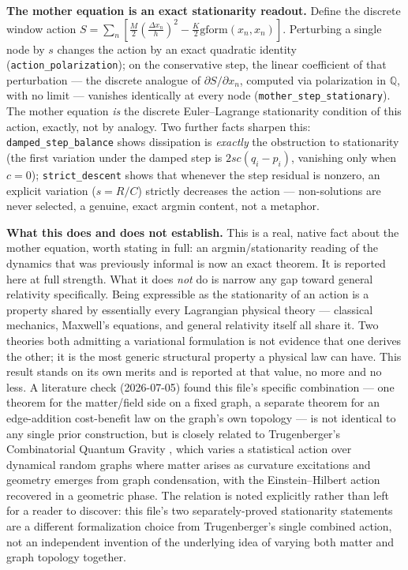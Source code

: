 \documentclass[10pt,twocolumn]{article}
\begin{document}
\textbf{The mother equation is an exact stationarity readout.} Define the discrete
window action $S=\sum_n\left[\frac{M}{2}\left(\frac{\Delta x_n}{h}\right)^2 -
\frac{K}{2}\mathrm{gform}(x_n,x_n)\right]$. Perturbing a single node by $s$ changes
the action by an exact quadratic identity (\texttt{action\_polarization}); on the
conservative step, the linear coefficient of that perturbation --- the discrete
analogue of $\partial S/\partial x_n$, computed via polarization in $\mathbb{Q}$,
with no limit --- vanishes identically at every node
(\texttt{mother\_step\_stationary}). The mother equation \emph{is} the discrete
Euler--Lagrange stationarity condition of this action, exactly, not by analogy.
Two further facts sharpen this: \texttt{damped\_step\_balance} shows dissipation is
\emph{exactly} the obstruction to stationarity (the first variation under the
damped step is $2sc(q_i-p_i)$, vanishing only when $c=0$); \texttt{strict\_descent}
shows that whenever the step residual is nonzero, an explicit variation
($s=R/C$) strictly decreases the action --- non-solutions are never selected, a
genuine, exact argmin content, not a metaphor.

\textbf{What this does and does not establish.} This is a real, native fact about
the mother equation, worth stating in full: an argmin/stationarity reading of the
dynamics that was previously informal is now an exact theorem. It is reported here
at full strength. What it does \emph{not} do is narrow any gap toward general
relativity specifically. Being expressible as the stationarity of an action is a
property shared by essentially every Lagrangian physical theory --- classical
mechanics, Maxwell's equations, and general relativity itself all share it. Two
theories both admitting a variational formulation is not evidence that one derives
the other; it is the most generic structural property a physical law can have.
This result stands on its own merits and is reported at that value, no more and no
less. A literature check (2026-07-05) found this file's specific combination ---
one theorem for the matter/field side on a fixed graph, a separate theorem for an
edge-addition cost-benefit law on the graph's own topology --- is not identical to
any single prior construction, but is closely related to Trugenberger's
Combinatorial Quantum Gravity \cite{trugenberger2017}, which varies a statistical
action over dynamical random graphs where matter arises as curvature excitations
and geometry emerges from graph condensation, with the Einstein--Hilbert action
recovered in a geometric phase. The relation is noted explicitly rather than left
for a reader to discover: this file's two separately-proved stationarity
statements are a different formalization choice from Trugenberger's single
combined action, not an independent invention of the underlying idea of varying
both matter and graph topology together.
\end{document}
